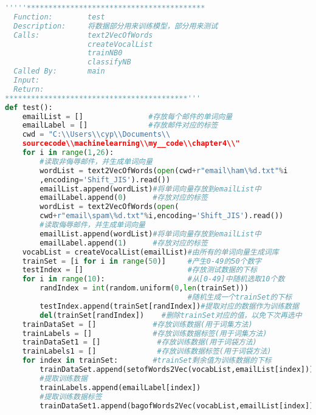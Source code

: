 \begin{lstlisting}[language=python]
'''''*****************************************
  Function:        test 
  Description:     将数据部分用来训练模型，部分用来测试 
  Calls:           text2VecOfWords 
                   createVocalList 
                   trainNB0 
                   classifyNB 
  Called By:       main 
  Input: 
  Return:           
******************************************'''  
def test():  
    emailList = []               #存放每个邮件的单词向量  
    emailLabel = []              #存放邮件对应的标签  
    cwd = "C:\\Users\\cyp\\Documents\\
    sourcecode\\machinelearning\\my__code\\chapter4\\"  
    for i in range(1,26):  
        #读取非侮辱邮件，并生成单词向量  
        wordList = text2VecOfWords(open(cwd+r"email\ham\%d.txt"%i
        ,encoding='Shift_JIS').read())  
        emailList.append(wordList)#将单词向量存放到emailList中  
        emailLabel.append(0)      #存放对应的标签  
        wordList = text2VecOfWords(open(
        cwd+r"email\spam\%d.txt"%i,encoding='Shift_JIS').read())  
        #读取侮辱邮件，并生成单词向量  
        emailList.append(wordList)#将单词向量存放到emailList中  
        emailLabel.append(1)      #存放对应的标签  
    vocabList = createVocalList(emailList)#由所有的单词向量生成词库  
    trainSet = [i for i in range(50)]     #产生0-49的50个数字  
    testIndex = []                        #存放测试数据的下标  
    for i in range(10):                   #从[0-49]中随机选取10个数  
        randIndex = int(random.uniform(0,len(trainSet)))  
                                          #随机生成一个trainSet的下标  
        testIndex.append(trainSet[randIndex])#提取对应的数据作为训练数据  
        del(trainSet[randIndex])    #删除trainSet对应的值，以免下次再选中  
    trainDataSet = []             #存放训练数据(用于词集方法)  
    trainLabels = []              #存放训练数据标签(用于词集方法)  
    trainDataSet1 = []             #存放训练数据(用于词袋方法)  
    trainLabels1 = []              #存放训练数据标签(用于词袋方法)  
    for index in trainSet:        #trainSet剩余值为训练数据的下标  
        trainDataSet.append(setofWords2Vec(vocabList,emailList[index]))  
        #提取训练数据  
        trainLabels.append(emailLabel[index])  
        #提取训练数据标签  
        trainDataSet1.append(bagofWords2Vec(vocabList,emailList[index]))  

\end{lstlisting}
